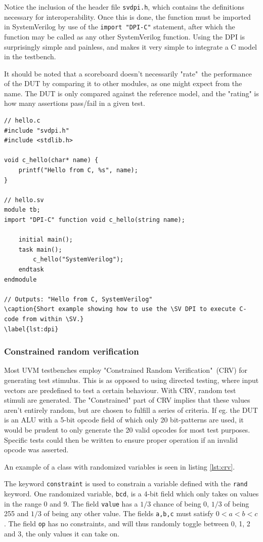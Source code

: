 \documentclass[conference]{IEEEtran}
\newcommand{\SV}{SystemVerilog\xspace}
\begin{document}
Notice the inclusion of the header file \texttt{svdpi.h}, which contains the definitions necessary for interoperability. Once this is done, the function must be imported in \SV by use of the \texttt{import "DPI-C"} statement, after which the function may be called as any other \SV function. Using the DPI is surprisingly simple and painless, and makes it very simple to integrate a C model in the testbench.

It should be noted that a scoreboard doesn't necessarily "rate"\, the performance of the DUT by comparing it to other modules, as one might expect from the name. The DUT is only compared against the reference model, and the "rating" is how many assertions pass/fail in a given test.

\begin{lstlisting}
// hello.c
#include "svdpi.h"
#include <stdlib.h>

void c_hello(char* name) {
	printf("Hello from C, %s", name);
}

// hello.sv
module tb;
import "DPI-C" function void c_hello(string name);

	initial main();
	task main();
		c_hello("SystemVerilog");
	endtask
endmodule

// Outputs: "Hello from C, SystemVerilog"
\caption{Short example showing how to use the \SV DPI to execute C-code from within \SV.}
\label{lst:dpi}
\end{lstlisting}

\subsubsection{Constrained random verification}

Most UVM testbenches employ "Constrained Random Verification"\, (CRV) for generating test stimulus. This is as opposed to using directed testing, where input vectors are predefined to test a certain behaviour. With CRV, random test stimuli are generated. The "Constrained" part of CRV implies that these values aren't entirely random, but are chosen to fulfill a series of criteria. If eg. the DUT is an ALU with a 5-bit opcode field of which only 20 bit-patterns are used, it would be prudent to only generate the 20 valid opcodes for most test purposes. Specific tests could then be written to ensure proper operation if an invalid opcode was asserted.

An example of a class with randomized variables is seen in listing \ref{lst:crv}. 

The keyword \texttt{constraint} is used to constrain a variable defined with the \texttt{rand} keyword.
One randomized variable, \texttt{bcd}, is a 4-bit field which only takes on values in the range 0 and 9. 
The field \texttt{value} has a $1/3$ chance of being 0, $1/3$ of being 255 and $1/3$ of being any other value. 
The fields \texttt{a,b,c} must satisfy $0<a<b<c$. 
The field \texttt{op} has no constraints, and will thus randomly toggle between  0, 1, 2 and 3, the only values it can take on.
\end{document}
